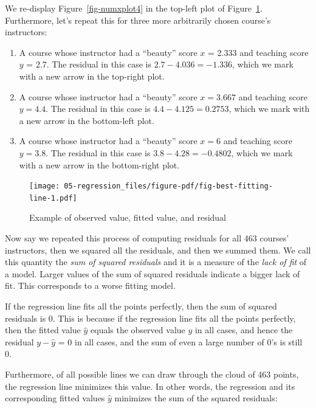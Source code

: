 \documentclass[
  letterpaper,
  DIV=11,
  numbers=noendperiod]{scrreprt}
\theoremstyle{definition}
\theoremstyle{remark}
\begin{document}
We re-display Figure~\ref{fig-numxplot4} in the top-left plot of
Figure~\ref{fig-best-fitting-line}. Furthermore, let's repeat this for
three more arbitrarily chosen course's instructors:

\begin{enumerate}
\def\labelenumi{\arabic{enumi}.}
\item
  A course whose instructor had a ``beauty'' score \(x\) = 2.333 and
  teaching score \(y\) = 2.7. The residual in this case is
  \(2.7 - 4.036 = -1.336\), which we mark with a new arrow in the
  top-right plot.
\item
  A course whose instructor had a ``beauty'' score \(x = 3.667\) and
  teaching score \(y = 4.4\). The residual in this case is
  \(4.4 - 4.125 = 0.2753\), which we mark with a new arrow in the
  bottom-left plot.
\item
  A course whose instructor had a ``beauty'' score \(x = 6\) and
  teaching score \(y = 3.8\). The residual in this case is
  \(3.8 - 4.28 = -0.4802\), which we mark with a new arrow in the
  bottom-right plot.
\end{enumerate}

\begin{figure}

{\centering \texttt{[image: 05-regression\_files/figure-pdf/fig-best-fitting-line-1.pdf]}

}

\caption{\label{fig-best-fitting-line}Example of observed value, fitted
value, and residual}

\end{figure}

Now say we repeated this process of computing residuals for all 463
courses' instructors, then we squared all the residuals, and then we
summed them. We call this quantity the \emph{sum of squared residuals}
and it is a measure of the \emph{lack of fit} of a model. Larger values
of the sum of squared residuals indicate a bigger lack of fit. This
corresponds to a worse fitting model.

If the regression line fits all the points perfectly, then the sum of
squared residuals is 0. This is because if the regression line fits all
the points perfectly, then the fitted value \(\widehat{y}\) equals the
observed value \(y\) in all cases, and hence the residual
\(y-\widehat{y}\) = 0 in all cases, and the sum of even a large number
of 0's is still 0.

Furthermore, of all possible lines we can draw through the cloud of 463
points, the regression line minimizes this value. In other words, the
regression and its corresponding fitted values \(\widehat{y}\) minimizes
the sum of the squared residuals:
\end{document}
